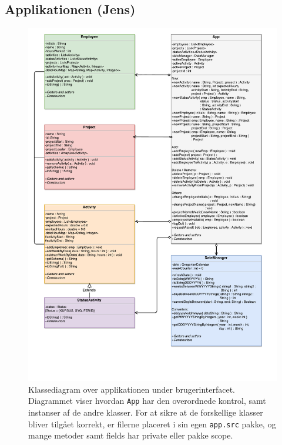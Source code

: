 \subsection{Applikationen (Jens)}
 
\begin{figure}[H]
    \centering
   \includegraphics[width = \textwidth]{Figurer/SE2UML.pdf}
    \caption{Klassediagram over applikationen under brugerinterfacet. Diagrammet viser hvordan \texttt{App} har den overordnede kontrol, samt instanser af de andre klasser. For at sikre at de forskellige klasser bliver tilgået korrekt, er filerne placeret i sin egen \texttt{app.src} pakke, og mange metoder samt fields har private eller pakke scope. 
    }
    \label{fig:SE2UML}
\end{figure}
